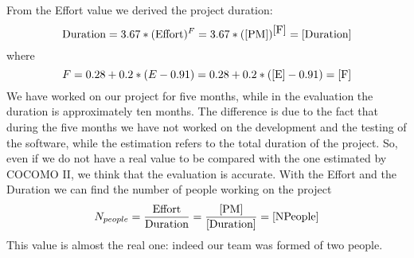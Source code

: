 From the Effort value we derived the project duration:
\begin{equation}
    \textrm{Duration} = 3.67 * (\textrm{Effort})^{F} = 3.67 * (\ref{PM})^{\ref{F}} = \manuallabel{Duration}{10.42}\ref{Duration}
\end{equation}
where
\begin{equation}
    F = 0.28 + 0.2 * (E - 0.91) = 0.28 + 0.2 * (\ref{E} - 0.91) = \manuallabel{F}{0.3112}\ref{F}
\end{equation}
\newline
We have worked on our project for five months, while in the evaluation the duration is approximately ten months. The difference is due to the fact that during the five months we have not worked on the development and the testing of the software, while the estimation refers to the total duration of the project.
\newline
So, even if we do not have a real value to be compared with the one estimated by COCOMO II, we think that the evaluation is accurate.
\newline
With the Effort and the Duration we can find the number of people working on the project
\begin{equation}
    N_{people} = \frac{\textrm{Effort}}{\textrm{Duration}} = \frac{\ref{PM}}{\ref{Duration}} = \manuallabel{NPeople}{2.74}\ref{NPeople}
\end{equation}
\newline
This value is almost the real one: indeed our team was formed of two people.